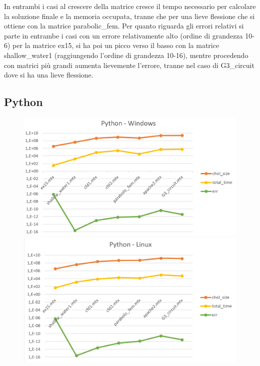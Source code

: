 \documentclass[a4paper,10pt]{article}
\begin{document}
In entrambi i casi al crescere della matrice cresce il tempo necessario per calcolare la soluzione finale e la memoria occupata, tranne che per una lieve flessione che si ottiene con la matrice parabolic\_fem. 
Per quanto riguarda gli errori relativi si parte in entrambe i casi con un errore relativamente alto (ordine di grandezza 10-6) per la matrice ex15, si ha poi un picco verso il basso con la matrice shallow\_water1 (raggiungendo l’ordine di grandezza 10-16), mentre procedendo con matrici più grandi aumenta lievemente l’errore, tranne nel caso di G3\_circuit dove si ha una lieve flessione. 


\subsection{Python}

\begin{figure}[H]
\centering
\begin{minipage}{.5\textwidth}
  \centering
  \includegraphics[width=1\linewidth]{img/pythonwin.png}
\end{minipage}%
\begin{minipage}{.5\textwidth}
  \centering
  \includegraphics[width=1\linewidth]{img/pythonlinux.png}
\end{minipage}
\end{figure}
\end{document}
